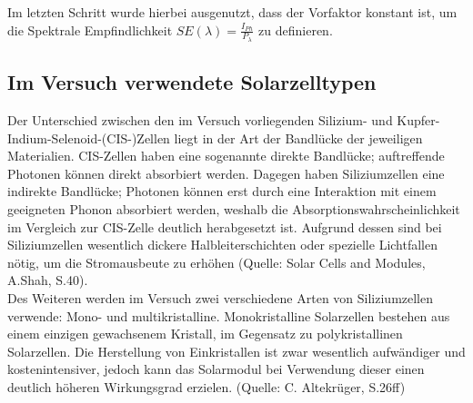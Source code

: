 Im letzten Schritt wurde hierbei ausgenutzt, dass der Vorfaktor konstant ist, um die Spektrale Empfindlichkeit $SE(\lambda) = \frac{I_{Ph}}{P_\lambda}$ zu definieren.

\subsection{Im Versuch verwendete Solarzelltypen}
Der Unterschied zwischen den im Versuch vorliegenden Silizium- und Kupfer-Indium-Selenoid-(CIS-)Zellen liegt in der Art der Bandlücke der jeweiligen Materialien. CIS-Zellen haben eine sogenannte direkte Bandlücke; auftreffende Photonen können direkt absorbiert werden. Dagegen haben Siliziumzellen eine indirekte Bandlücke; Photonen können erst durch eine Interaktion mit einem geeigneten Phonon absorbiert werden, weshalb die Absorptionswahrscheinlichkeit im Vergleich zur CIS-Zelle deutlich herabgesetzt ist. Aufgrund dessen sind bei Siliziumzellen wesentlich dickere Halbleiterschichten oder spezielle Lichtfallen nötig, um die Stromausbeute zu erhöhen (Quelle: Solar Cells and Modules, A.Shah, S.40). \\
Des Weiteren werden im Versuch zwei verschiedene Arten von Siliziumzellen verwende: Mono- und multikristalline. Monokristalline Solarzellen bestehen aus einem einzigen gewachsenem Kristall, im Gegensatz zu polykristallinen Solarzellen. Die Herstellung von Einkristallen ist zwar wesentlich aufwändiger und kostenintensiver, jedoch kann das Solarmodul bei Verwendung dieser einen deutlich höheren Wirkungsgrad erzielen. (Quelle: C. Altekrüger, S.26ff)

